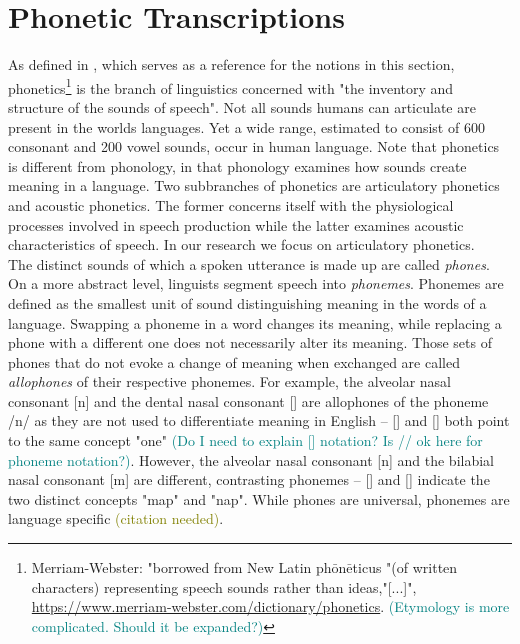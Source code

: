 \section{Phonetic Transcriptions}\label{sec:phonetic_transcriptions}
As defined in \cite{ogrady2017introToLinguistics}, which serves as a reference for the notions in this section, phonetics\footnote{Merriam-Webster: "borrowed from New Latin ph$\bar{\mbox{o}}$n$\bar{\mbox{e}}$ticus "(of written characters) representing speech sounds rather than ideas,"[...]", \url{https://www.merriam-webster.com/dictionary/phonetics}. \textcolor{teal}{(Etymology is more complicated. Should it be expanded?)}} is the branch of linguistics concerned with "the inventory and structure of the sounds of speech".
Not all sounds humans can articulate are present in the worlds languages.
Yet a wide range, estimated to consist of 600 consonant and 200 vowel sounds, occur in human language.
Note that phonetics is different from phonology, in that phonology examines how sounds create meaning in a language.
Two subbranches of phonetics are articulatory phonetics and acoustic phonetics.
The former concerns itself with the physiological processes involved in speech production while the latter examines acoustic characteristics of speech.
In our research we focus on articulatory phonetics.\\
The distinct sounds of which a spoken utterance is made up are called \textit{phones}.
On a more abstract level, linguists segment speech into \textit{phonemes}.
Phonemes are defined as the smallest unit of sound distinguishing meaning in the words of a language.
Swapping a phoneme in a word changes its meaning, while replacing a phone with a different one does not necessarily alter its meaning.
Those sets of phones that do not evoke a change of meaning when exchanged are called \textit{allophones} of their respective phonemes.
For example, the alveolar nasal consonant [n] and the dental nasal consonant [\textipa{\|[n}] are allophones of the phoneme /n/ as they are not used to differentiate meaning in English -- [] and [\textipa{w2\|[n}] both point to the same concept "one" \textcolor{teal}{(Do I need to explain [] notation? Is // ok here for phoneme notation?)}.
However, the alveolar nasal consonant [n] and the bilabial nasal consonant [m] are different, contrasting phonemes -- [] and [] indicate the two distinct concepts "map" and "nap".
While phones are universal, phonemes are language specific \textcolor{olive}{(citation needed)}.\\
